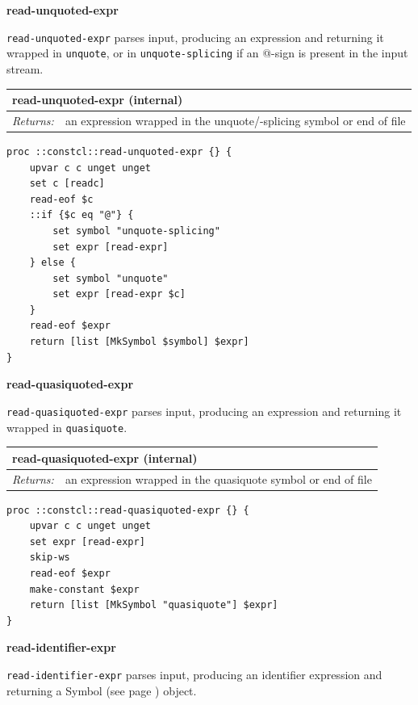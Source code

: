 \documentclass[twoside,9pt]{report}
\begin{document}
\textbf{read-unquoted-expr}


\texttt{read-unquoted-expr} parses input, producing an expression and returning it wrapped in \texttt{unquote}, or in \texttt{unquote-splicing} if an @-sign is present in the input stream.

\begin{tabular}{ |l l| }
\hline
\multicolumn{2}{|l|}{read-unquoted-expr (internal)} \\
\hline
\textit{Returns:} & an expression wrapped in the unquote/-splicing symbol or end of file \\
\hline
\end{tabular}

\noindent\makebox[\linewidth]{\rule{\linewidth}{0.4pt}}
\begin{lstlisting}
proc ::constcl::read-unquoted-expr {} {
    upvar c c unget unget
    set c [readc]
    read-eof $c
    ::if {$c eq "@"} {
        set symbol "unquote-splicing"
        set expr [read-expr]
    } else {
        set symbol "unquote"
        set expr [read-expr $c]
    }
    read-eof $expr
    return [list [MkSymbol $symbol] $expr]
}
\end{lstlisting}
\noindent\makebox[\linewidth]{\rule{\linewidth}{0.4pt}}

\textbf{read-quasiquoted-expr}


\texttt{read-quasiquoted-expr} parses input, producing an expression and returning it wrapped in \texttt{quasiquote}.

\begin{tabular}{ |l l| }
\hline
\multicolumn{2}{|l|}{read-quasiquoted-expr (internal)} \\
\hline
\textit{Returns:} & an expression wrapped in the quasiquote symbol or end of file \\
\hline
\end{tabular}

\noindent\makebox[\linewidth]{\rule{\linewidth}{0.4pt}}
\begin{lstlisting}
proc ::constcl::read-quasiquoted-expr {} {
    upvar c c unget unget
    set expr [read-expr]
    skip-ws
    read-eof $expr
    make-constant $expr
    return [list [MkSymbol "quasiquote"] $expr]
}
\end{lstlisting}
\noindent\makebox[\linewidth]{\rule{\linewidth}{0.4pt}}

\textbf{read-identifier-expr}


\texttt{read-identifier-expr} parses input, producing an identifier expression and returning a Symbol (see page \pageref{symbols}) object.
\end{document}
